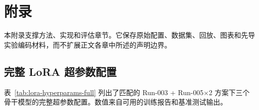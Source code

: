 \chapter{附录}\label{ch:appendix}

本附录支撑方法、实现和评估章节。它保存原始配置、数据集、回放、图表和先导实验编码材料，而不扩展正文各章中所述的声明边界。

\section{完整 LoRA 超参数配置}\label{sec:appendix-hyperparams}

表~\ref{tab:lora-hyperparams-full} 列出了匹配的 Run-003 + Run-005$\times$2 方案下三个骨干模型的完整超参数配置。数值来自可用的训练报告和基准测试输出。

